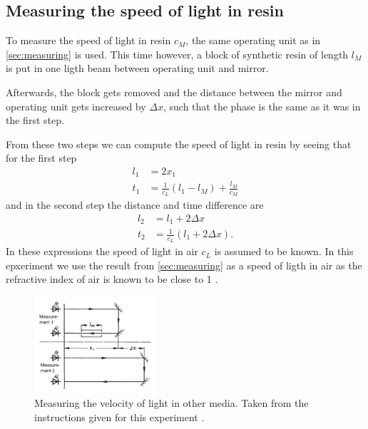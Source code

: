 \subsection{Measuring the speed of light in resin}
\label{sec:MeasuringResin}
To measure the speed of light in resin $c_M$, the same operating unit as in \autoref{sec:measuring} is
used. This time however, a block of synthetic resin of length $l_M$ is put in one ligth beam between
operating unit and mirror.

Afterwards, the block gets removed and the distance between the mirror and operating unit gets
increased by $\Delta x$, such that the phase is the same as it was in the first step.

From these two steps we can compute the speed of light in resin by seeing that for the first step
\begin{align}
  l_1 &= 2 x_1 \\
  t_1 &= \frac{1}{c_L} (l_1 - l_M) + \frac{l_M}{c_M}
\end{align}
and in the second step the distance and time difference are
\begin{align}
  l_2 &= l_1 + 2\Delta x \\
  t_2 &= \frac{1}{c_L} (l_1 + 2 \Delta x).
\end{align}
In these expressions the speed of light in air $c_L$ is assumed to be known. In this epxeriment we
use the result from \autoref{sec:measuring} as a speed of ligth in air as the refractive index of air
is known to be close to 1 \cite{refractiveIndex}.
\begin{figure}
    \centering
    \includegraphics[width=0.4\textwidth]{media/Setup Resin.png}
    \caption{Measuring the velocity of light in other media. Taken
      from the instructions given for this experiment \cite{LabInstructions}.}
    \label{fig:SetupResin}
\end{figure}


